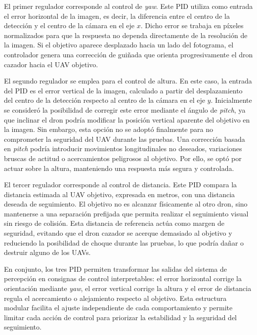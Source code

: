 \vspace{0.3cm}

El primer regulador corresponde al control de \textit{yaw}. Este PID utiliza como entrada el error horizontal de la imagen, es decir, la diferencia entre el centro de la detección y el centro de la cámara en el eje $x$. Dicho error se trabaja en píxeles normalizados para que la respuesta no dependa directamente de la resolución de la imagen. Si el objetivo aparece desplazado hacia un lado del fotograma, el controlador genera una corrección de guiñada que orienta progresivamente el dron cazador hacia el UAV objetivo.

\vspace{0.3cm}

El segundo regulador se emplea para el control de altura. En este caso, la entrada del PID es el error vertical de la imagen, calculado a partir del desplazamiento del centro de la detección respecto al centro de la cámara en el eje $y$. Inicialmente se consideró la posibilidad de corregir este error mediante el ángulo de \textit{pitch}, ya que inclinar el dron podría modificar la posición vertical aparente del objetivo en la imagen. Sin embargo, esta opción no se adoptó finalmente para no comprometer la seguridad del UAV durante las pruebas. Una corrección basada en \textit{pitch} podría introducir movimientos longitudinales no deseados, variaciones bruscas de actitud o acercamientos peligrosos al objetivo. Por ello, se optó por actuar sobre la altura, manteniendo una respuesta más segura y controlada.

\vspace{0.3cm}

El tercer regulador corresponde al control de distancia. Este PID compara la distancia estimada al UAV objetivo, expresada en metros, con una distancia deseada de seguimiento. El objetivo no es alcanzar físicamente al otro dron, sino mantenerse a una separación prefijada que permita realizar el seguimiento visual sin riesgo de colisión. Esta distancia de referencia actúa como margen de seguridad, evitando que el dron cazador se acerque demasiado al objetivo y reduciendo la posibilidad de choque durante las pruebas, lo que podría dañar o destruir alguno de los UAVs.

\vspace{0.3cm}

En conjunto, los tres PID permiten transformar las salidas del sistema de percepción en consignas de control interpretables: el error horizontal corrige la orientación mediante \textit{yaw}, el error vertical corrige la altura y el error de distancia regula el acercamiento o alejamiento respecto al objetivo. Esta estructura modular facilita el ajuste independiente de cada comportamiento y permite limitar cada acción de control para priorizar la estabilidad y la seguridad del seguimiento.  
